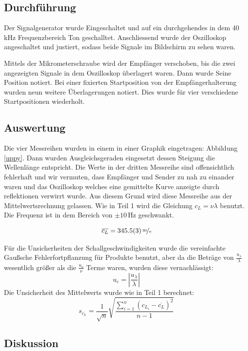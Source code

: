 \documentclass[11pt,a4paper]{article}
\begin{document}
\subsection{Durchführung}

Der Signalgenerator wurde Eingeschaltet und auf ein durchgehendes in dem 40\,kHz Frequenzbereich Ton geschalltet. Anschliessend wurde der Oszilloskop angeschaltet und justiert, sodass beide Signale im Bildschirm zu sehen waren. 

Mittels der Mikrometerschraube wird der Empfänger verschoben, bis die zwei angezeigten Signale in dem Oszilloskop überlagert waren. Dann wurde Seine Position notiert. Bei einer fixierten Startposition von der Empfängerhalterung wurden neun weitere Überlagerungen notiert. Dies wurde für vier verschiedene Startpositionen wiederholt. 

\subsection{Auswertung}

Die vier Messreihen wurden in einem in einer Graphik eingetragen: Abbildung \ref{uppy}. Dann wurden Ausgleichsgeraden eingesetzt dessen Steigung die Wellenlänge entspricht. Die Werte in der dritten Messreihe sind offensichtlich fehlerhaft und wir vermuten, dass Empfänger und Sender zu nah zu einander waren und das Oszilloskop welches eine gemittelte Kurve anzeigte durch reflektionen verwirrt wurde. Aus diesem Grund wird diese Messreihe aus der Mittelwertsrechnung gelassen. Wie in Teil 1 wird die Gleichung $c_L = \nu \lambda$ benutzt. Die Frequenz ist in dem Bereich von $\pm10\,$Hz geschwankt. 

$$\overline{c_L} = 345.5(3)\,\nicefrac{\textrm{m}}{\textrm{s}}$$

Für die Unsicherheiten der Schallgeschwindigkeiten wurde die vereinfachte Gaußsche Fehlerfortpflanzung für Produkte benutzt, aber da die Beträge von $\frac{u_\lambda}{\lambda}$ wesentlich größer als die $\frac{u_\nu}{\nu}$ Terme waren, wurden diese vernachlässigt:
$$ u_c = \left| \frac{u_\lambda}{\lambda}\right|$$
Die Unsicherheit des Mittelwerts wurde wie in Teil 1 berechnet:
$$s_{\overline{c_L}} = \frac{1}{\sqrt{n}} \sqrt{\frac{\sum_{i=1}^{n}(c_{L_i}-\overline{c_L})^2}{n-1}}$$

\subsection{Diskussion}

\pagebreak
\end{document}
